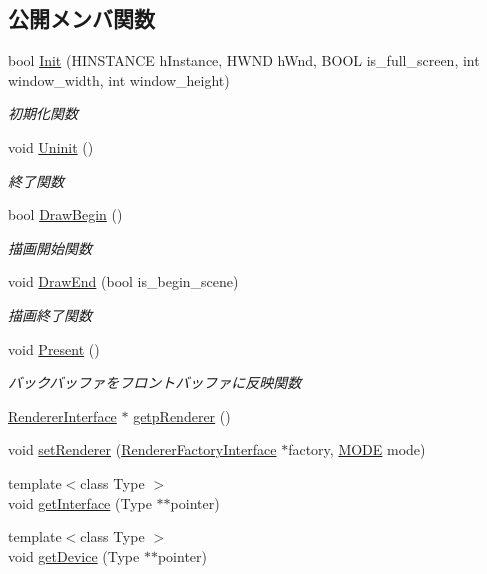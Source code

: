 \subsection*{公開メンバ関数}
\begin{DoxyCompactItemize}
\item 
bool \mbox{\hyperlink{class_renderer_a8d576add80187f5be3f24ec6a8108100}{Init}} (H\+I\+N\+S\+T\+A\+N\+CE h\+Instance, H\+W\+ND h\+Wnd, B\+O\+OL is\+\_\+full\+\_\+screen, int window\+\_\+width, int window\+\_\+height)
\begin{DoxyCompactList}\small\item\em 初期化関数 \end{DoxyCompactList}\item 
void \mbox{\hyperlink{class_renderer_ae865246d6a04d467ac22458f6f5f69d4}{Uninit}} ()
\begin{DoxyCompactList}\small\item\em 終了関数 \end{DoxyCompactList}\item 
bool \mbox{\hyperlink{class_renderer_af420951c9c163f1151bd6600df204cee}{Draw\+Begin}} ()
\begin{DoxyCompactList}\small\item\em 描画開始関数 \end{DoxyCompactList}\item 
void \mbox{\hyperlink{class_renderer_a0393849bd4178a33861780bf07b0deee}{Draw\+End}} (bool is\+\_\+begin\+\_\+scene)
\begin{DoxyCompactList}\small\item\em 描画終了関数 \end{DoxyCompactList}\item 
void \mbox{\hyperlink{class_renderer_a1dac4baae1fa79166442b0778a9c8728}{Present}} ()
\begin{DoxyCompactList}\small\item\em バックバッファをフロントバッファに反映関数 \end{DoxyCompactList}\item 
\mbox{\hyperlink{class_renderer_interface}{Renderer\+Interface}} $\ast$ \mbox{\hyperlink{class_renderer_a0d026a0f20ae978c19fd4924b06d26e2}{getp\+Renderer}} ()
\item 
void \mbox{\hyperlink{class_renderer_a02e3c483b2c9d8024e51639a06159066}{set\+Renderer}} (\mbox{\hyperlink{class_renderer_factory_interface}{Renderer\+Factory\+Interface}} $\ast$factory, \mbox{\hyperlink{class_renderer_ab5a9379ccadcf2b3394c61cf8c835fec}{M\+O\+DE}} mode)
\item 
{\footnotesize template$<$class Type $>$ }\\void \mbox{\hyperlink{class_renderer_a6e77556825755be3db8a5a734460e66f}{get\+Interface}} (Type $\ast$$\ast$pointer)
\item 
{\footnotesize template$<$class Type $>$ }\\void \mbox{\hyperlink{class_renderer_a56662123051f8898c4e8e9d5457fd317}{get\+Device}} (Type $\ast$$\ast$pointer)
\end{DoxyCompactItemize}
